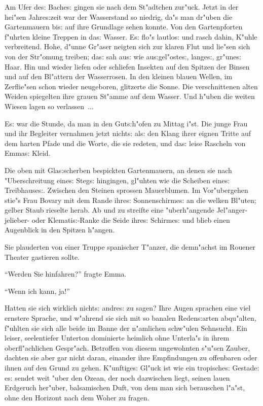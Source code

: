 \documentclass[oneside,12pt]{book}
\newcommand{\s}{s:}%
\begin{document}
Am Ufer de{\s} Bache{\s} gingen sie nach dem St"adtchen zur"uck.
Jetzt in der hei"sen Jahre{\s}zeit war der Wasserstand so niedrig,
da"s man dr"uben die Gartenmauern bi{\s} auf ihre Grundlage sehen
konnte. Von den Gartenpforten f"uhrten kleine Treppen in da{\s}
Wasser. E{\s} flo"s lautlo{\s} und rasch dahin, K"uhle
verbreitend. Hohe, d"unne Gr"aser neigten sich zur klaren Flut und
lie"sen sich von der Str"omung treiben; da{\s} sah au{\s} wie
au{\s}gel"oste{\s}, lange{\s}, gr"une{\s} Haar. Hin und wieder
liefen oder schliefen Insekten auf den Spitzen der Binsen und auf
den Bl"attern der Wasserrosen. In den kleinen blauen Wellen, im
Zerflie"sen schon wieder neugeboren, glitzerte die Sonne. Die
verschnittenen alten Weiden spiegelten ihre grauen St"amme auf dem
Wasser. Und h"uben die weiten Wiesen lagen so verlassen~...

E{\s} war die Stunde, da man in den Gut{\s}h"ofen zu Mittag i"st.
Die junge Frau und ihr Begleiter vernahmen jetzt nicht{\s} al{\s}
den Klang ihrer eignen Tritte auf dem harten Pfade und die Worte,
die sie redeten, und da{\s} leise Rascheln von Emma{\s} Kleid.

Die oben mit Gla{\s}scherben bespickten Gartenmauern, an denen sie
nach "Uberschreitung eine{\s} Steg{\s} hingingen, gl"uhten wie die
Scheiben eine{\s} Treibhause{\s}. Zwischen den Steinen sprossen
Mauerblumen. Im Vor"ubergehen stie"s Frau Bovary mit dem Rande
ihre{\s} Sonnenschirme{\s} an die welken Bl"uten; gelber Staub
rieselte herab. Ab und zu streifte eine "uberh"angende
Jel"anger-jelieber- oder Klemati{\s}-Ranke die Seide ihre{\s}
Schirme{\s} und blieb einen Augenblick in den Spitzen h"angen.

Sie plauderten von einer Truppe spanischer T"anzer, die demn"achst
im Rouener Theater gastieren sollte.

"`Werden Sie hinfahren?"' fragte Emma.

"`Wenn ich kann, ja!"'

Hatten sie sich wirklich nicht{\s} andre{\s} zu sagen? Ihre Augen
sprachen eine viel ernstere Sprache, und w"ahrend sie sich mit so
banalen Reden{\s}arten abqu"alten, f"uhlten sie sich alle beide im
Banne der n"amlichen schw"ulen Sehnsucht. Ein leiser, seelentiefer
Unterton dominierte heimlich ohne Unterla"s in ihrem
oberfl"achlichen Gespr"ach. Betroffen von diesem ungewohnten
s"u"sen Zauber, dachten sie aber gar nicht daran, einander ihre
Empfindungen zu offenbaren oder ihnen auf den Grund zu gehen.
K"unftige{\s} Gl"uck ist wie ein tropische{\s} Gestade: e{\s}
sendet weit "uber den Ozean, der noch dazwischen liegt, seinen
lauen Erdgeruch her"uber, balsamischen Duft, von dem man sich
berauschen l"a"st, ohne den Horizont nach dem Woher zu fragen.
\end{document}
